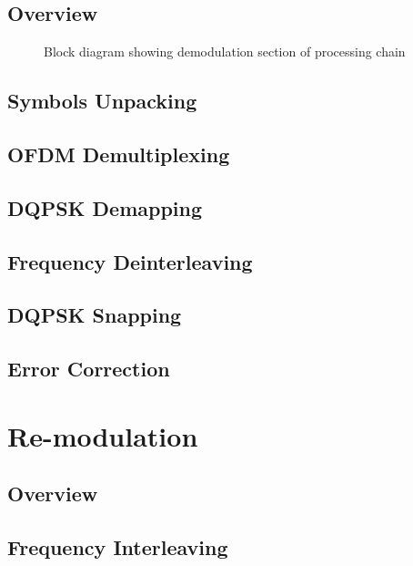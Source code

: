\documentclass[class=report,11pt,crop=false]{standalone}
\begin{document}
\subsection{Overview}

\begin{figure}[htbp]
    \centering
    \def\svgwidth{\linewidth}
    { %
        }
    \caption{Block diagram showing demodulation section of processing chain}
    \label{fig:BD_Demod_All}
\end{figure}


\subsection{Symbols Unpacking \label{subsect:dab-proc_symbols-unpack}}
\subsection{OFDM Demultiplexing \label{subsect:dab-proc_ofdm-demux}}
\subsection{DQPSK Demapping \label{subsect:dab-proc_dqpsk-demap}}
\subsection{Frequency Deinterleaving \label{subsect:dab-proc_freq-deinterleave}}
\subsection{DQPSK Snapping \label{subsect:dab-proc_dqpsk-snap}}
\subsection{Error Correction \label{subsect:dab-proc_error-correct}}

\section{Re-modulation \label{sect:dab-proc_remodulate}}

\subsection{Overview}

\subsection{Frequency Interleaving \label{subsect:dab-proc_freq-interleave}}
\end{document}
